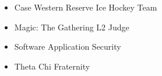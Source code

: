 \documentclass[]{friggeri-cv}
\begin{document}
\begin{itemize}
  \item Case Western Reserve Ice Hockey Team
  \item Magic: The Gathering L2 Judge
  \item Software Application Security
  \item Theta Chi Fraternity
\end{itemize}

% 
\end{document}
